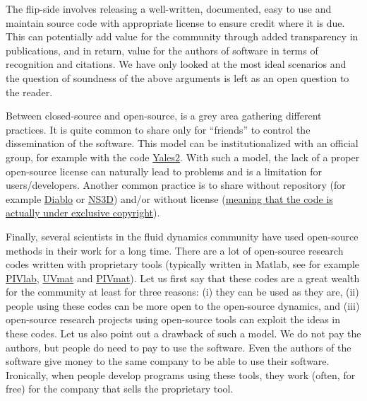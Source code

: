 The flip-side involves releasing a well-written, documented, easy to use and
maintain source code with appropriate license to ensure credit where it is due.
This can potentially add value for the community through added transparency in
publications, and in return, value for the authors of software in terms of
recognition and citations. We have only looked at the most ideal scenarios and
the question of soundness of the above arguments is left as an open question to
the reader.

Between closed-source and open-source, is a grey area gathering different
practices.
%
It is quite common to share only for ``friends'' to control the dissemination
of the software.
%
This model can be institutionalized with an official group, for example with
the code \href{https://www.coria-cfd.fr/index.php/YALES2}{Yales2}.
%
With such a model, the lack of a proper open-source license can naturally lead
to problems and is a limitation for users/developers.
%
Another common practice is to share without repository (for example
\href{http://www.damtp.cam.ac.uk/user/jrt51/files.html}{Diablo} or
\href{http://yakari.polytechnique.fr/people/deloncle/ns3d.html}{NS3D}) and/or
without license (\href{https://choosealicense.com/no-permission/}{meaning that the
code is actually under exclusive copyright}).

Finally, several scientists in the fluid dynamics community have used
open-source methods in their work for a long time.
%
There are a lot of open-source research codes written with proprietary tools
(typically written in Matlab, see for example
\href{http://pivlab.blogspot.de/}{PIVlab},
\href{http://servforge.legi.grenoble-inp.fr/projects/soft-uvmat/}{UVmat} and
\href{https://de.mathworks.com/matlabcentral/fileexchange/10902-pivmat-4-00}{PIVmat}).
%
Let us first say that these codes are a great wealth for the community at least
for three reasons: (i) they can be used as they are, (ii) people using these
codes can be more open to the open-source dynamics, and (iii) open-source
research projects using open-source tools can exploit the ideas in these codes.
%
Let us also point out a drawback of such a model. We do not pay the authors, but
people do need to pay to use the software. Even the authors of the software give
money to the same company to be able to use their software. 
%
Ironically, when people develop programs using these tools, they work (often,
for free) for the company that sells the proprietary tool.


